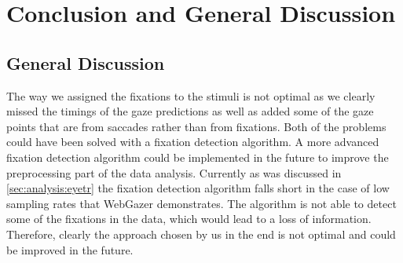 ﻿\chapter{Conclusion and General Discussion}
\label{sec:conclusion}

\section{General Discussion}
\label{sec:general-discussion}

The way we assigned the fixations to the stimuli is not optimal as we clearly missed the timings of the gaze predictions as well as added some of the gaze points that are from saccades rather than from fixations. Both of the problems could have been solved with a fixation detection algorithm. A more advanced fixation detection algorithm could be implemented in the future to improve the preprocessing part of the data analysis. Currently as was discussed in \autoref{sec:analysis:eyetr} the fixation detection algorithm falls short in the case of low sampling rates that WebGazer demonstrates. The algorithm is not able to detect some of the fixations in the data, which would lead to a loss of information. Therefore, clearly the approach chosen by us in the end is not optimal and could be improved in the future.